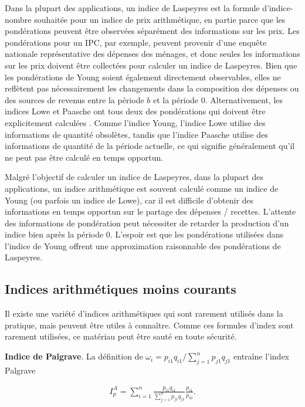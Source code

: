 \documentclass[
]{article}
\begin{document}
Dans la plupart des applications, un indice de Laspeyres est la formule d'indice-nombre souhaitée pour un indice de prix arithmétique, en partie parce que les pondérations peuvent être observées séparément des informations sur les prix. Les pondérations pour un IPC, par exemple, peuvent provenir d'une enquête nationale représentative des dépenses des ménages, et donc seules les informations sur les prix doivent être collectées pour calculer un indice de Laspeyres. Bien que les pondérations de Young soient également directement observables, elles ne reflètent pas nécessairement les changements dans la composition des dépenses ou des sources de revenus entre la période \(b\) et la période 0. Alternativement, les indices Lowe et Paasche ont tous deux des pondérations qui doivent être explicitement calculées . Comme l'indice Young, l'indice Lowe utilise des informations de quantité obsolètes, tandis que l'indice Paasche utilise des informations de quantité de la période actuelle, ce qui signifie généralement qu'il ne peut pas être calculé en temps opportun.

Malgré l'objectif de calculer un indice de Laspeyres, dans la plupart des applications, un indice arithmétique est souvent calculé comme un indice de Young (ou parfois un indice de Lowe), car il est difficile d'obtenir des informations en temps opportun sur le partage des dépenses / recettes. L'attente des informations de pondération peut nécessiter de retarder la production d'un indice bien après la période 0. L'espoir est que les pondérations utilisées dans l'indice de Young offrent une approximation raisonnable des pondérations de Laspeyres.

\hypertarget{indices-arithmuxe9tiques-moins-courants}{%
\subsection{Indices arithmétiques moins courants}\label{indices-arithmuxe9tiques-moins-courants}}

Il existe une variété d'indices arithmétiques qui sont rarement utilisés dans la pratique, mais peuvent être utiles à connaître. Comme ces formules d'index sont rarement utilisées, ce matériau peut être sauté en toute sécurité.

\textbf{Indice de Palgrave}. La définition de \(\omega_{i} = p_{i1} q_{i1} / \sum_{j = 1}^{n} p_{j1} q_{j1}\) entraîne l'index Palgrave

\begin{align*}
I^{A}_{p} = \sum_{i = 1}^{n} \frac{p_{i1} q_{i1}}{\sum_{j = 1}^{n} p_{j1} q_{j1}} \frac{p_{i1}}{p_{i0}}.
\end{align*}
\end{document}

